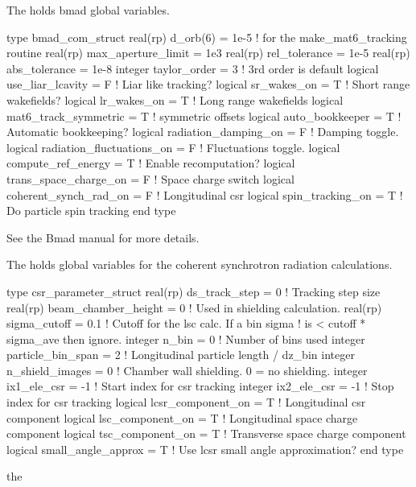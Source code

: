 {{{{{{{{{{The  holds bmad global variables. 
\begin{example}
  type bmad_com_struct
    real(rp) d_orb(6) = 1e-5  ! for the make_mat6_tracking routine
    real(rp) max_aperture_limit = 1e3    
    real(rp) rel_tolerance = 1e-5
    real(rp) abs_tolerance = 1e-8
    integer taylor_order = 3               ! 3rd order is default
    logical use_liar_lcavity = F           ! Liar like tracking?
    logical sr_wakes_on = T                ! Short range wakefields?
    logical lr_wakes_on = T                ! Long range wakefields
    logical mat6_track_symmetric = T       ! symmetric offsets
    logical auto_bookkeeper = T            ! Automatic bookkeeping?
    logical radiation_damping_on = F       ! Damping toggle.
    logical radiation_fluctuations_on = F  ! Fluctuations toggle.
    logical compute_ref_energy = T         ! Enable recomputation?
    logical trans_space_charge_on = F      ! Space charge switch
    logical coherent_synch_rad_on = F      ! Longitudinal csr 
    logical spin_tracking_on = T           ! Do particle spin tracking
  end type
\end{example}
See the Bmad manual for more details.

The  holds global variables for the coherent
synchrotron radiation calculations. 
\begin{example}
  type csr_parameter_struct
    real(rp) ds_track_step = 0          ! Tracking step size
    real(rp) beam_chamber_height = 0    ! Used in shielding calculation.
    real(rp) sigma_cutoff = 0.1         ! Cutoff for the lsc calc. If a bin sigma
                                           !  is < cutoff * sigma_ave then ignore.
    integer n_bin = 0                   ! Number of bins used
    integer particle_bin_span = 2       ! Longitudinal particle length / dz_bin
    integer n_shield_images = 0         ! Chamber wall shielding. 0 = no shielding.
    integer ix1_ele_csr = -1            ! Start index for csr tracking
    integer ix2_ele_csr = -1            ! Stop index for csr tracking
    logical lcsr_component_on = T       ! Longitudinal csr component
    logical lsc_component_on = T        ! Longitudinal space charge component
    logical tsc_component_on = T        ! Transverse space charge component
    logical small_angle_approx = T      ! Use lcsr small angle approximation?
  end type
\end{example}
the \vn{global%
See the Bmad manual for more details.

}}}}}}}}}}}
